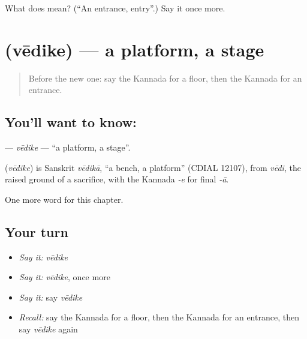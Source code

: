 \begin{tcolorbox}[breakable,colback=teal!4,colframe=teal!35!black,title={Before you move on}]
What does  mean? (\textquotedblleft{}An entrance, entry\textquotedblright{}.) Say it once more.
\end{tcolorbox}
\section[\texorpdfstring{\kn{ವೇದಿಕೆ} (vēdike)}{ವೇದಿಕೆ (vēdike)}]{ (vēdike) — a platform, a stage}

\label{lesson:KA-C286-vedike}



\begin{quote}
Before the new one: say the Kannada for a floor, then the Kannada for an entrance.
\end{quote}

\subsection*{You'll want to know: }
\textbf{} — \emph{vēdike} — \textquotedblleft{}a platform, a stage\textquotedblright{}.

\begin{cousinweb}
\textbf{} (\emph{vēdike}) is Sanskrit \emph{vēdikā}, \textquotedblleft{}a bench, a platform\textquotedblright{} (CDIAL 12107), from \emph{vēdi}, the raised ground of a sacrifice, with the Kannada \emph{-e} for final \emph{-ā}.
\end{cousinweb}

\begin{grammarlens}[title={What you've built}]
One more word for this chapter.
\end{grammarlens}

\subsection*{Your turn}
\begin{itemize}
\raggedright
  \item \emph{Say it:} \emph{vēdike}
  \item \emph{Say it:} \emph{vēdike}, once more
  \item \emph{Say it:} say \emph{vēdike}
  \item \emph{Recall:} say the Kannada for a floor, then the Kannada for an entrance, then say \emph{vēdike} again
\end{itemize}

